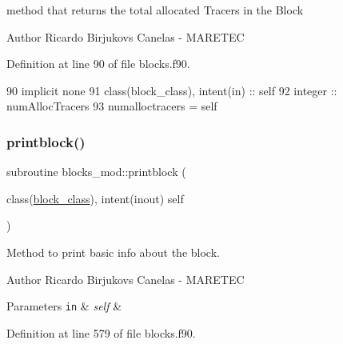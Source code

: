 method that returns the total allocated Tracers in the Block 

\begin{DoxyAuthor}{Author}
Ricardo Birjukovs Canelas -\/ M\+A\+R\+E\+T\+EC 
\end{DoxyAuthor}


Definition at line 90 of file blocks.\+f90.


\begin{DoxyCode}
90     \textcolor{keywordtype}{implicit none}
91     \textcolor{keywordtype}{class}(block\_class), \textcolor{keywordtype}{intent(in)} :: self
92     \textcolor{keywordtype}{integer} :: numAllocTracers
93     numalloctracers = self%
\end{DoxyCode}
\mbox{\label{namespaceblocks__mod_a6eab8b323cb15dcecb5c6b0c31b4e246}} 
\subsubsection{\texorpdfstring{printblock()}{printblock()}}
{\footnotesize\ttfamily subroutine blocks\+\_\+mod\+::printblock (\begin{DoxyParamCaption}\item[{class(\mbox{\hyperlink{structblocks__mod_1_1block__class}{block\+\_\+class}}), intent(inout)}]{self }\end{DoxyParamCaption})\hspace{0.3cm}{\ttfamily [private]}}



Method to print basic info about the block. 

\begin{DoxyAuthor}{Author}
Ricardo Birjukovs Canelas -\/ M\+A\+R\+E\+T\+EC 
\end{DoxyAuthor}

\begin{DoxyParams}[1]{Parameters}
\mbox{\tt in}  & {\em self} & \\
\hline
\end{DoxyParams}


Definition at line 579 of file blocks.\+f90.



